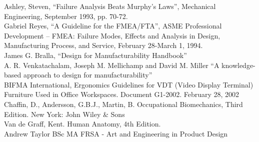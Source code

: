 \begin{thebibliography}{15}
\noindent Ashley, Steven, “Failure Analysis Beats Murphy’s Laws”, Mechanical Engineering, September 1993, pp. 70-72.\\
\noindent Gabriel Reyes, “A Guideline for the FMEA/FTA”, ASME Professional Development – FMEA: Failure Modes, Effects and Analysis in Design, Manufacturing Process, and Service, February 28-March 1, 1994.\\
\noindent James G. Bralla, “Design for Manufacturability Handbook”\\
\noindent A. R. Venkatachalam, Joseph M. Mellichamp and David M. Miller “A knowledge-based approach to design for manufacturability”\\
\noindent BIFMA International, Ergonomics Guidelines for VDT (Video Display Terminal) Furniture Used in Office Workspaces.  Document G1-2002. February 28, 2002 \\
\noindent Chaffin, D., Andersson, G.B.J., Martin, B. Occupational Biomechanics, Third Edition. New York: John Wiley & Sons\\
\noindent Van de Graff, Kent. Human Anatomy, 4th Edition.\\
\noindent Andrew Taylor BSc MA FRSA - Art and Engineering in Product Design\\





\end{thebibliography}